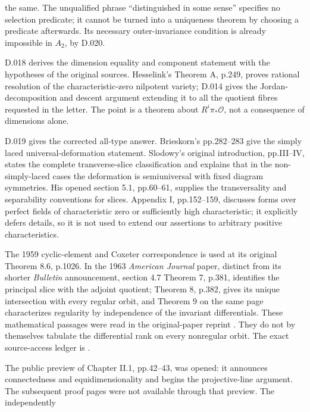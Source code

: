 \begin{description}
the same.  The unqualified phrase ``distinguished in some
sense'' specifies no selection predicate; it cannot be
turned into a uniqueness theorem by choosing a predicate
afterwards.  Its necessary outer-invariance condition is
already impossible in $A_2$, by D.020.
\item[Letter: dimensions and rational singularities.]
D.018 derives the dimension equality and component
statement with the hypotheses of the original sources.
Hesselink's Theorem A, p.249, proves rational resolution
of the characteristic-zero nilpotent variety; D.014 gives
the Jordan-decomposition and descent argument extending
it to all the quotient fibres requested in the letter.
The point is a theorem about $R^i\pi_*\mathcal O$, not a
consequence of dimensions alone.
\item[Letter: subregular uniqueness and rank.] D.019
gives the corrected all-type answer.  Brieskorn's
pp.282--283 give the simply laced universal-deformation
statement.  Slodowy's original introduction, pp.III--IV,
states the complete transverse-slice classification and
explains that in the non-simply-laced cases the deformation
is semiuniversal with fixed diagram symmetries.
His opened section 5.1, pp.60--61, supplies the transversality
and separability conventions for slices.  Appendix I,
pp.152--159, discusses forms over perfect fields of
characteristic zero or sufficiently high characteristic;
it explicitly defers details, so it is not used to extend
our assertions to arbitrary positive characteristics.
\item[Kostant 1959 and 1963.] The 1959 cyclic-element and
Coxeter correspondence is used at its original Theorem 8.6,
p.1026.  In the 1963 \emph{American Journal} paper, distinct
from its shorter \emph{Bulletin} announcement, section 4.7
Theorem 7, p.381, identifies the principal slice with the
adjoint quotient; Theorem 8, p.382, gives its unique
intersection with every regular orbit, and Theorem 9 on
the same page characterizes regularity by independence of
the invariant differentials.  These mathematical passages
were read in the original-paper reprint \cite{D-Kostant1963}.
They do not by themselves tabulate the differential rank
on every nonregular orbit.  The exact source-access ledger
is .
\item[Spaltenstein LNM 946.] The public preview of
Chapter II.1, pp.42--43, was opened: it announces
connectedness and equidimensionality and begins the
projective-line argument.  The subsequent proof pages
were not available through that preview.  The independently

\end{description}
